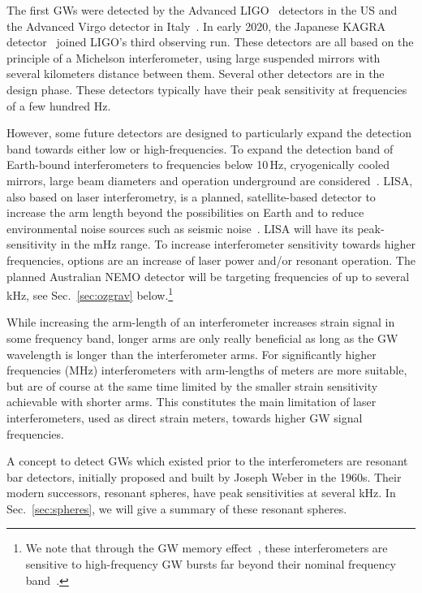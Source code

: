 \documentclass[11pt,a4paper]{article}
\begin{document}
The first GWs were detected by the Advanced LIGO~\cite{PhysRevLett.116.131103} detectors in the US and the Advanced Virgo detector in Italy~\cite{AdvVirgo}. In early 2020, the Japanese KAGRA detector~\cite{PhysRevD.88.043007} joined LIGO's third observing run. These detectors are all based on the principle of a Michelson interferometer, using large suspended mirrors with several kilometers distance between them. Several other detectors are in the design phase. These  detectors typically have their peak sensitivity at frequencies of a few hundred Hz.

However, some future detectors are designed to particularly expand the detection band towards either low or high-frequencies.
To expand the detection band of Earth-bound interferometers to frequencies below 10\,Hz, cryogenically cooled mirrors, large beam diameters and operation underground are considered~\cite{ETdesign,Adhikari_2020}.
LISA, also based on laser interferometry, is a planned, satellite-based detector to increase the arm length beyond the possibilities on Earth and to reduce environmental noise sources such as seismic noise~\cite{Audley:2017drz}. LISA will have its peak-sensitivity in the mHz range. To increase interferometer sensitivity towards higher frequencies, options are an increase of laser power and/or resonant operation. The planned Australian NEMO detector will be targeting frequencies of up to several kHz, see Sec.~\ref{sec:ozgrav} below.\footnote{We note that through the GW memory effect~\cite{Christodoulou:1991cr,Thorne:1992sdb}, these interferometers are sensitive to high-frequency GW bursts far beyond their nominal frequency band~\cite{mcneill2017gravitational,ebersold2020search}. }


While increasing the arm-length of an interferometer increases strain signal in some frequency band, longer arms are only really beneficial as long as the GW wavelength is longer than the interferometer arms. For significantly higher frequencies (MHz) interferometers with arm-lengths of meters are more suitable, but are of course at the same time limited by the smaller strain sensitivity achievable with shorter arms. This constitutes the main limitation of laser interferometers, used as direct strain meters,
towards higher GW signal frequencies.


A concept to detect GWs which existed prior to the interferometers are resonant bar detectors, initially proposed and built by Joseph Weber in the 1960s. Their modern successors, resonant spheres, have peak sensitivities at several kHz. In Sec.~\ref{sec:spheres}, we will give a summary of these resonant spheres.
\end{document}
